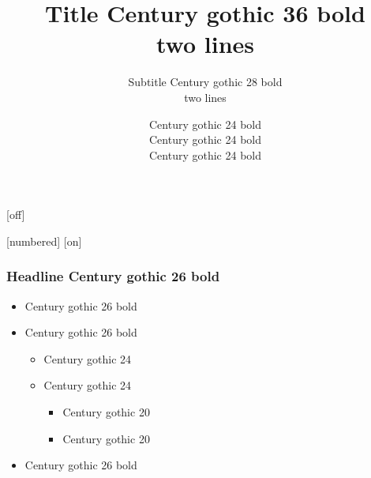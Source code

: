 \documentclass[t]{beamer}
\title{Title Century gothic 36 bold \\two lines}
\subtitle{Subtitle Century gothic 28 bold\\ two lines}
\author{Century gothic 24 bold\\Century gothic 24 bold\\Century gothic 24 bold}
\begin{document}
\begin{frame}
{}[off]
\end{frame}
[numbered]
[on]
\begin{frame}
	\frametitle{Headline Century gothic 26 bold}
	\begin{itemize}
		\item Century gothic 26 bold
		\item Century gothic 26 bold
		\begin{itemize}
			\item Century gothic 24
			\item Century gothic 24
			\begin{itemize}
				\item Century gothic 20
				\item Century gothic 20
			\end{itemize}
		\end{itemize}
		\item Century gothic 26 bold
	\end{itemize}
\end{frame}
\end{document}

